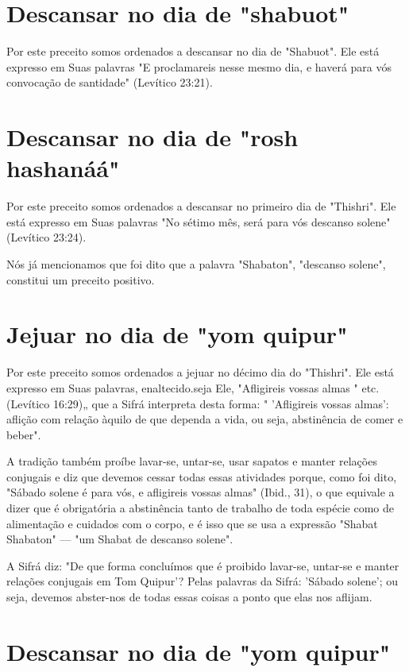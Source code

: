\begin{itemize}
\begin{enumrate}
\begin{itemize}
\begin{itemize}
\begin{itemize}
\section{Descansar no dia de "shabuot"}

Por este preceito somos ordenados a descansar no dia de "Shabuot". Ele
está expresso em Suas palavras "E proclamareis nesse mesmo dia, e haverá
para vós convocação de santidade" (Levítico 23:21).

\section{Descansar no dia de "rosh hashanáá"}

Por este preceito somos ordenados a descansar no primeiro dia de
"Thishri". Ele está expresso em Suas palavras "No sétimo mês, será para
vós descanso solene" (Levítico 23:24).

Nós já mencionamos que foi dito que a palavra "Shabaton", "des­canso
solene", constitui um preceito positivo.

\section{Jejuar no dia de "yom quipur"}

Por este preceito somos ordenados a jejuar no décimo dia do "This­hri".
Ele está expresso em Suas palavras, enaltecido.seja
Ele, "Afligireis vossas almas " etc. (Levítico 16:29)„ que a Sifrá
interpreta desta forma: " 'Afligireis vossas 
almas': aflição com relação àquilo de que dependa a vida, ou seja,
abstinên­cia de comer e beber".

A tradição também proíbe lavar-se, untar-se, usar sapatos e manter
relações conjugais e diz que devemos cessar todas essas atividades
porque, co­mo foi dito, "Sábado solene é para vós, e afligireis vossas
almas" (Ibid., 31), o que equivale a dizer que é obrigatória a
abstinência tanto de trabalho de toda espécie como de alimentação e
cuidados com o corpo, e é isso que se usa a expressão "Shabat Shabaton"
--- "um Shabat de descanso solene".

A Sifrá diz: "De que forma concluímos que é proibido lavar-se, untar-se
e manter relações conjugais em Tom Quipur'? Pelas palavras da Sifrá:
'Sába­do solene'; ou seja, devemos abster-nos de todas essas coisas a
ponto que elas nos aflijam.

\section{Descansar no dia de "yom quipur"}


\end{itemize}
\end{itemize}
\end{itemize}
\end{enumrate}
\end{itemize}

